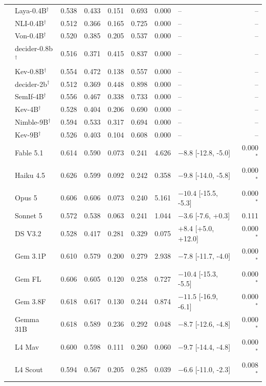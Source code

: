 \begin{longtable}{llrrrrrlr}
 & Laya-0.4B$^{\dagger}$ & 0.538 & 0.433 & 0.151 & 0.693 & 0.000 & -- & -- \\
 & NLI-0.4B$^{\dagger}$ & 0.512 & 0.366 & 0.165 & 0.725 & 0.000 & -- & -- \\
 & Von-0.4B$^{\dagger}$ & 0.520 & 0.385 & 0.205 & 0.537 & 0.000 & -- & -- \\
 & decider-0.8b$^{\dagger}$ & 0.516 & 0.371 & 0.415 & 0.837 & 0.000 & -- & -- \\
 & Kev-0.8B$^{\dagger}$ & 0.554 & 0.472 & 0.138 & 0.557 & 0.000 & -- & -- \\
 & decider-2b$^{\dagger}$ & 0.512 & 0.369 & 0.448 & 0.898 & 0.000 & -- & -- \\
 & SemIf-4B$^{\dagger}$ & 0.556 & 0.467 & 0.338 & 0.733 & 0.000 & -- & -- \\
 & Kev-4B$^{\dagger}$ & 0.528 & 0.404 & 0.206 & 0.690 & 0.000 & -- & -- \\
 & Nimble-9B$^{\dagger}$ & 0.594 & 0.533 & 0.317 & 0.694 & 0.000 & -- & -- \\
 & Kev-9B$^{\dagger}$ & 0.526 & 0.403 & 0.104 & 0.608 & 0.000 & -- & -- \\
 & Fable 5.1 & 0.614 & 0.590 & 0.073 & 0.241 & 4.626 & $-8.8$ [-12.8, -5.0] & 0.000$^{*}$ \\
 & Haiku 4.5 & 0.626 & 0.599 & 0.092 & 0.242 & 0.358 & $-9.8$ [-14.0, -5.8] & 0.000$^{*}$ \\
 & Opus 5 & 0.606 & 0.606 & 0.073 & 0.240 & 5.161 & $-10.4$ [-15.5, -5.3] & 0.000$^{*}$ \\
 & Sonnet 5 & 0.572 & 0.538 & 0.063 & 0.241 & 1.044 & $-3.6$ [-7.6, +0.3] & 0.111 \\
 & DS V3.2 & 0.528 & 0.417 & 0.281 & 0.329 & 0.075 & $+8.4$ [+5.0, +12.0] & 0.000$^{*}$ \\
 & Gem 3.1P & 0.610 & 0.579 & 0.200 & 0.279 & 2.938 & $-7.8$ [-11.7, -4.0] & 0.000$^{*}$ \\
 & Gem FL & 0.606 & 0.605 & 0.120 & 0.258 & 0.727 & $-10.4$ [-15.3, -5.5] & 0.000$^{*}$ \\
 & Gem 3.8F & 0.618 & 0.617 & 0.130 & 0.244 & 0.874 & $-11.5$ [-16.9, -6.1] & 0.000$^{*}$ \\
 & Gemma 31B & 0.618 & 0.589 & 0.236 & 0.292 & 0.048 & $-8.7$ [-12.6, -4.8] & 0.000$^{*}$ \\
 & L4 Mav & 0.600 & 0.598 & 0.111 & 0.260 & 0.060 & $-9.7$ [-14.4, -4.8] & 0.000$^{*}$ \\
 & L4 Scout & 0.594 & 0.567 & 0.205 & 0.285 & 0.039 & $-6.6$ [-11.0, -2.3] & 0.008$^{*}$ \\

\end{longtable}

